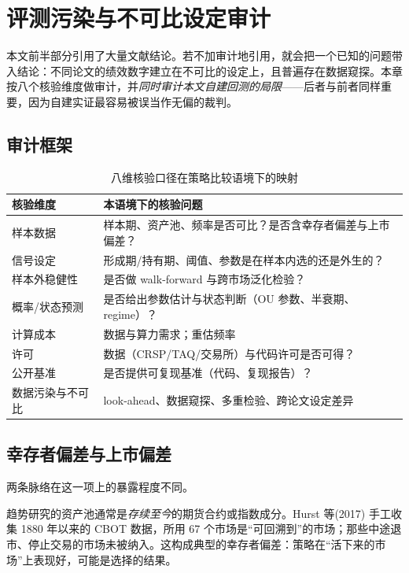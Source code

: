 \section{评测污染与不可比设定审计}\label{sec:audit}

本文前半部分引用了大量文献结论。若不加审计地引用，就会把一个已知的问题带入结论：不同论文的绩效数字建立在不可比的设定上，且普遍存在数据窥探。本章按八个核验维度做审计，并\emph{同时审计本文自建回测的局限}——后者与前者同样重要，因为自建实证最容易被误当作无偏的裁判。

\subsection{审计框架}

\begin{table}[htbp]
\centering\footnotesize
\caption{八维核验口径在策略比较语境下的映射}\label{tab:audit}
\begin{tabular}{@{}>{\raggedright\arraybackslash}p{2.6cm}>{\raggedright\arraybackslash}p{11.2cm}@{}}
\toprule
\textbf{核验维度} & \textbf{本语境下的核验问题} \\
\midrule
样本数据 & 样本期、资产池、频率是否可比？是否含幸存者偏差与上市偏差？ \\
信号设定 & 形成期/持有期、阈值、参数是在样本内选的还是外生的？ \\
样本外稳健性 & 是否做 walk-forward 与跨市场泛化检验？ \\
概率/状态预测 & 是否给出参数估计与状态判断（OU 参数、半衰期、regime）？ \\
计算成本 & 数据与算力需求；重估频率 \\
许可 & 数据（CRSP/TAQ/交易所）与代码许可是否可得？ \\
公开基准 & 是否提供可复现基准（代码、复现报告）？ \\
数据污染与不可比 & look-ahead、数据窥探、多重检验、跨论文设定差异 \\
\bottomrule
\end{tabular}
\end{table}

\subsection{幸存者偏差与上市偏差}

两条脉络在这一项上的暴露程度不同。

趋势研究的资产池通常是\emph{存续至今}的期货合约或指数成分。Hurst 等(2017) 手工收集 1880 年以来的 CBOT 数据，所用 67 个市场是“可回溯到”的市场\cite{hop2017}；那些中途退市、停止交易的市场未被纳入。这构成典型的幸存者偏差：策略在“活下来的市场”上表现好，可能是选择的结果。

